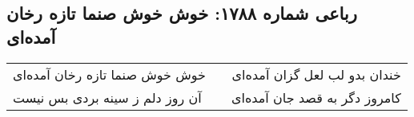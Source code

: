 \begin{center}
\section*{رباعی شماره ۱۷۸۸: خوش خوش صنما تازه رخان آمده‌ای}
\label{sec:1788}
\begin{longtable}{l p{0.5cm} r}
خوش خوش صنما تازه رخان آمده‌ای
&&
خندان بدو لب لعل گزان آمده‌ای
\\
آن روز دلم ز سینه بردی بس نیست
&&
کامروز دگر به قصد جان آمده‌ای
\\
\end{longtable}
\end{center}
